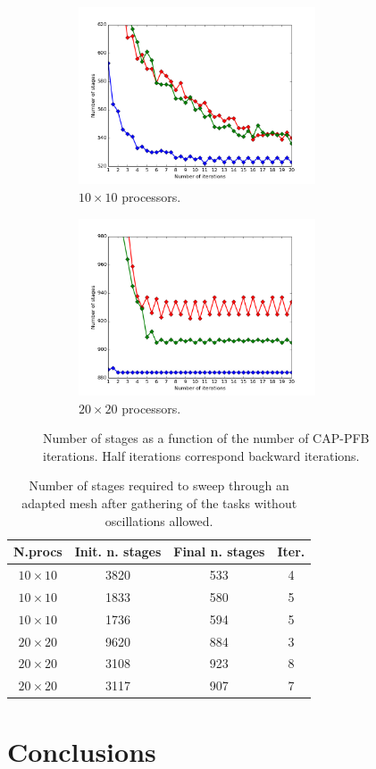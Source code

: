 \documentclass[letterpaper]{article}
\renewcommand{\(}{\left(}
\renewcommand{\)}{\right)}
\renewcommand{\[}{\left[}
\renewcommand{\]}{\right]}
\begin{document}
\begin{figure}[H]
  \begin{subfigure}[b]{.5\textwidth}
    \centering
    \includegraphics[width=7cm]{convergence_band_20_20}
    \caption{$10\times 10$ processors.}
  \end{subfigure}
  \begin{subfigure}[b]{.5\textwidth}
    \centering
    \includegraphics[width=7cm]{convergence_band_40_40}
    \caption{$20\times 20$ processors.}
  \end{subfigure}
  \caption{Number of stages as a function of the number of CAP-PFB iterations.
  Half iterations correspond backward iterations.}
  \label{convergence_band}
\end{figure}

\begin{table}[H]
  \begin{center}
    \begin{tabular}{|c|c|c|c|}
      \hline
      N.procs & Init. n. stages & Final n. stages & Iter. \\
      \hline
      $10 \times 10$ & 3820 & 533 & 4 \\
      $10 \times 10$ & 1833 & 580 & 5 \\
      $10 \times 10$ & 1736 & 594 & 5 \\
      $20 \times 20$ & 9620 & 884 & 3 \\
      $20 \times 20$ & 3108 & 923 & 8 \\
      $20 \times 20$ & 3117 & 907 & 7 \\
      \hline
    \end{tabular}
    \caption{Number of stages required to sweep through an adapted mesh after
    gathering of the tasks without oscillations allowed.}
    \label{band_3}
  \end{center}
\end{table}

\section{Conclusions} \label{conclusions}




\end{document}
